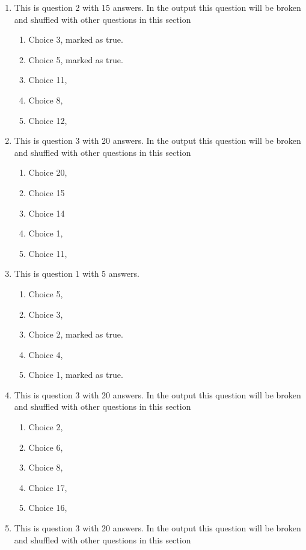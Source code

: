 \documentclass[a4paper,10pt]{article}%
\begin{document}
\begin{enumerate}
	
\item  This is question 2 with 15 answers. In the output this question will be broken and shuffled with other questions in this section
	
\begin{enumerate}
\item  Choice 3, marked as true. %
		\item  Choice 5, marked as true. %
		\item  Choice 11,
		\item  Choice 8,
		\item  Choice 12,
		\end{enumerate}
\item  This is question 3 with 20 answers. In the output this question will be broken and shuffled with other questions in this section
	
\begin{enumerate}
\item  Choice 20, %
	\item  Choice 15
		\item  Choice 14
		\item  Choice 1,
		\item  Choice 11,
		\end{enumerate}
\item  This is question 1 with 5 answers.
	
\begin{enumerate}
\item  Choice 5,
	\item  Choice 3, 
		\item  Choice 2, marked as true. %
		\item  Choice 4,
		\item  Choice 1, marked as true. %
		\end{enumerate}
\item  This is question 3 with 20 answers. In the output this question will be broken and shuffled with other questions in this section
	
\begin{enumerate}
\item  Choice 2,
		\item  Choice 6,
		\item  Choice 8,
		\item  Choice 17,
		\item  Choice 16,
		\end{enumerate}
\item  This is question 3 with 20 answers. In the output this question will be broken and shuffled with other questions in this section
	

\end{enumerate}
\end{document}
